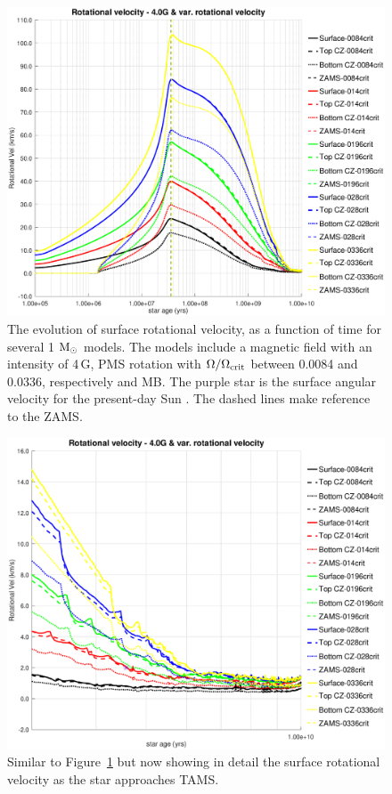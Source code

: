 \documentclass[fleqn,usenatbib]{mnras}
\begin{document}
{{\begin{figure}
	\includegraphics[trim = 30mm 15mm 20mm 15mm, clip,width=\columnwidth]{figures/rot_vel_var_vel_4_0g.eps}
    \caption{The evolution of surface rotational velocity, as a function of time for several 1 $\mathrm{M}_\odot$ models. The models include a magnetic field with an intensity of 4\,G, PMS rotation with $\Omega / \Omega_{\mathrm{crit}}$ between 0.0084 and 0.0336, respectively and MB. The purple star is the surface angular velocity for the present-day Sun \citep{Gill2012}. The dashed lines make reference to the ZAMS.}
    \label{fig:rot_vel_4g}
\end{figure}

\begin{figure}
	\includegraphics[trim = 30mm 15mm 20mm 15mm, clip,width=\columnwidth]{figures/rot_vel_var_vel_4_0g_z1.eps}
    \caption{Similar to Figure~\ref{fig:rot_vel_4g} but now showing in detail the surface rotational velocity as the star approaches TAMS.}
    \label{fig:rot_vel_4g_z1}
\end{figure}

}}
\end{document}
